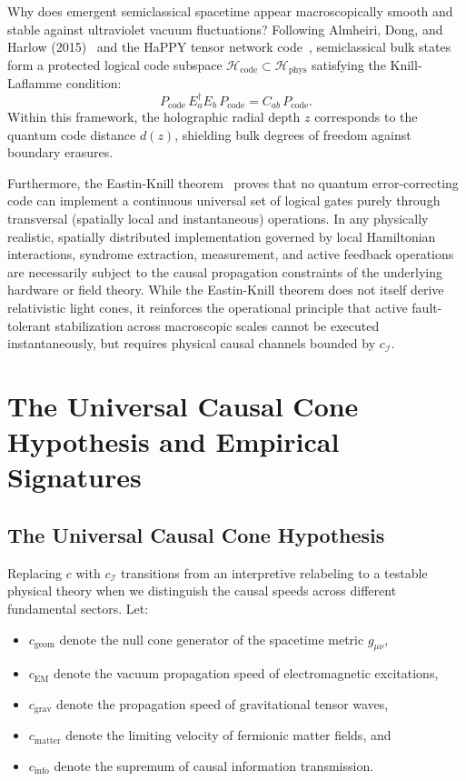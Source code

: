 \documentclass[11pt,a4paper]{article}
\begin{document}
Why does emergent semiclassical spacetime appear macroscopically smooth and stable against ultraviolet vacuum fluctuations? Following Almheiri, Dong, and Harlow (2015)~\cite{almheiri2015} and the HaPPY tensor network code~\cite{pastawski2015}, semiclassical bulk states form a protected logical code subspace $\mathcal{H}_{\text{code}} \subset \mathcal{H}_{\text{phys}}$ satisfying the Knill-Laflamme condition:
\begin{equation}
P_{\text{code}} \, E_a^\dagger E_b \, P_{\text{code}} = C_{ab} \, P_{\text{code}}.
\end{equation}
Within this framework, the holographic radial depth $z$ corresponds to the quantum code distance $d(z)$, shielding bulk degrees of freedom against boundary erasures. 

Furthermore, the Eastin-Knill theorem~\cite{eastin2009} proves that no quantum error-correcting code can implement a continuous universal set of logical gates purely through transversal (spatially local and instantaneous) operations. In any physically realistic, spatially distributed implementation governed by local Hamiltonian interactions, syndrome extraction, measurement, and active feedback operations are necessarily subject to the causal propagation constraints of the underlying hardware or field theory. While the Eastin-Knill theorem does not itself derive relativistic light cones, it reinforces the operational principle that active fault-tolerant stabilization across macroscopic scales cannot be executed instantaneously, but requires physical causal channels bounded by $c_{\mathcal{I}}$.

\section{The Universal Causal Cone Hypothesis and Empirical Signatures}

\subsection{The Universal Causal Cone Hypothesis}

Replacing $c$ with $c_{\mathcal{I}}$ transitions from an interpretive relabeling to a testable physical theory when we distinguish the causal speeds across different fundamental sectors. Let:
\begin{itemize}
    \item $c_{\text{geom}}$ denote the null cone generator of the spacetime metric $g_{\mu\nu}$,
    \item $c_{\text{EM}}$ denote the vacuum propagation speed of electromagnetic excitations,
    \item $c_{\text{grav}}$ denote the propagation speed of gravitational tensor waves,
    \item $c_{\text{matter}}$ denote the limiting velocity of fermionic matter fields, and
    \item $c_{\text{info}}$ denote the supremum of causal information transmission.
\end{itemize}
\end{document}
